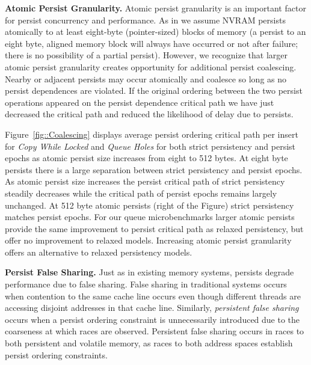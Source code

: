 \textbf{Atomic Persist Granularity.}
Atomic persist granularity is an important factor for persist concurrency and performance.
As in \cite{Condit09} we assume NVRAM persists atomically to at least eight-byte (pointer-sized) blocks of memory (a persist to an eight byte, aligned memory block will always have occurred or not after failure; there is no possibility of a partial persist).
However, we recognize that larger atomic persist granularity creates opportunity for additional persist coalescing.
Nearby or adjacent persists may occur atomically and coalesce so long as no persist dependences are violated.
If the original ordering between the two persist operations appeared on the persist dependence critical path we have just decreased the critical path and reduced the likelihood of delay due to persists.

 

Figure~\ref{fig::Coalescing} displays average persist ordering critical path per insert for \emph{Copy While Locked} and \emph{Queue Holes} for both strict persistency and persist epochs as atomic persist size increases from eight to 512 bytes.
At eight byte persists there is a large separation between strict persistency and persist epochs.
As atomic persist size increases the persist critical path of strict persistency steadily decreases while the critical path of persist epochs remains largely unchanged.
At 512 byte atomic persists (right of the Figure) strict persistency matches persist epochs.
For our queue microbenchmarks larger atomic persists provide the same improvement to persist critical path as relaxed persistency, but offer no improvement to relaxed models.
Increasing atomic persist granularity offers an alternative to relaxed persistency models.

\textbf{Persist False Sharing.}
Just as in existing memory systems, persists degrade performance due to false sharing.
False sharing in traditional systems occurs when contention to the same cache line occurs even though different threads are accessing disjoint addresses in that cache line.
Similarly, \emph{persistent false sharing} occurs when a persist ordering constraint is unnecessarily introduced due to the coarseness at which races are observed.
Persistent false sharing occurs in races to both persistent and volatile memory, as races to both address spaces establish persist ordering constraints.

